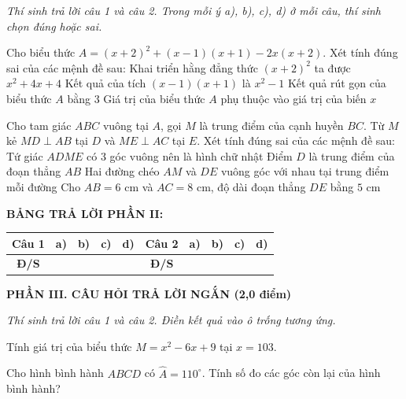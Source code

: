 \documentclass[12pt,a4paper]{article}
\begin{document}
\textit{Thí sinh trả lời câu 1 và câu 2. Trong mỗi ý a), b), c), d) ở mỗi câu, thí sinh chọn đúng hoặc sai.}

\vspace{1mm}
\begin{ex}
Cho biểu thức $A = (x + 2)^2 + (x - 1)(x + 1) - 2x(x + 2)$. Xét tính đúng sai của các mệnh đề sau:
\choiceTF
{\True Khai triển hằng đẳng thức $(x + 2)^2$ ta được $x^2 + 4x + 4$}
{\True Kết quả của tích $(x - 1)(x + 1)$ là $x^2 - 1$}
{\True Kết quả rút gọn của biểu thức $A$ bằng $3$}
{Giá trị của biểu thức $A$ phụ thuộc vào giá trị của biến $x$}
\end{ex}

\begin{ex}
Cho tam giác $ABC$ vuông tại $A$, gọi $M$ là trung điểm của cạnh huyền $BC$. Từ $M$ kẻ $MD \perp AB$ tại $D$ và $ME \perp AC$ tại $E$. Xét tính đúng sai của các mệnh đề sau:
\choiceTF
{\True Tứ giác $ADME$ có 3 góc vuông nên là hình chữ nhật}
{\True Điểm $D$ là trung điểm của đoạn thẳng $AB$}
{Hai đường chéo $AM$ và $DE$ vuông góc với nhau tại trung điểm mỗi đường}
{\True Cho $AB = 6\text{ cm}$ và $AC = 8\text{ cm}$, độ dài đoạn thẳng $DE$ bằng $5\text{ cm}$}
\end{ex}


\noindent\textbf{BẢNG TRẢ LỜI PHẦN II:}
\begin{center}
\begin{tabular}{|c|c|c|c|c||c|c|c|c|c|}
\hline
\textbf{Câu 1} & \textbf{a)} & \textbf{b)} & \textbf{c)} & \textbf{d)} & \textbf{Câu 2} & \textbf{a)} & \textbf{b)} & \textbf{c)} & \textbf{d)} \\
\hline
\textbf{Đ/S} & \rule{0pt}{0.6cm} & & & & \textbf{Đ/S} & & & & \\
\hline
\end{tabular}
\end{center}
\vspace{2mm}

\setcounter{ex}{0}
\noindent\textbf{\large PHẦN III. CÂU HỎI TRẢ LỜI NGẮN (2,0 điểm)}

\textit{Thí sinh trả lời câu 1 và câu 2. Điền kết quả vào ô trống tương ứng.}

\vspace{1mm}
\begin{ex}
Tính giá trị của biểu thức $M = x^2 - 6x + 9$ tại $x = 103$. 
\end{ex}

\begin{ex}
Cho hình bình hành $ABCD$ có $\widehat{A} = 110^\circ$. Tính số đo các góc còn lại của hình bình hành? 
\end{ex}
\end{document}

